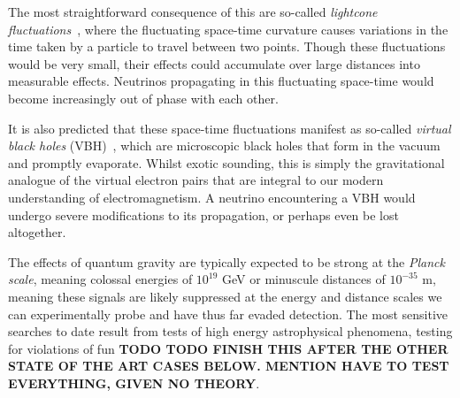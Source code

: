 \documentclass[a4paper,11pt]{article}
\begin{document}
The most straightforward consequence of this are so-called \textit{lightcone fluctuations}~\cite{PauliLightcone, Ford1999, gr-qc/9909085}, where the fluctuating space-time curvature causes variations in the time taken by a particle to travel between two points. Though these fluctuations would be very small, their effects could accumulate over large distances into measurable effects. Neutrinos propagating in this fluctuating space-time would become increasingly out of phase with each other.

It is also predicted that these space-time fluctuations manifest as so-called \textit{virtual black holes} (VBH)~\cite{Hawking1982,PhysRevD.53.3099}, which are microscopic black holes that form in the vacuum and promptly evaporate. Whilst exotic sounding, this is simply the gravitational analogue of the virtual electron pairs that are integral to our modern understanding of electromagnetism. A neutrino encountering a VBH would undergo severe modifications to its propagation, or perhaps even be lost altogether.

The effects of quantum gravity are typically expected to be strong at the \textit{Planck scale}, meaning colossal energies of $10^{19}$ GeV or minuscule distances of $10^{-35}$ m, meaning these signals are likely suppressed at the energy and distance scales we can experimentally probe and have thus far evaded detection. The most sensitive searches to date result from tests of high energy astrophysical phenomena, testing for violations of fun \textbf{TODO TODO FINISH THIS AFTER THE OTHER STATE OF THE ART CASES BELOW. MENTION HAVE TO TEST EVERYTHING, GIVEN NO THEORY}. \\







\end{document}
